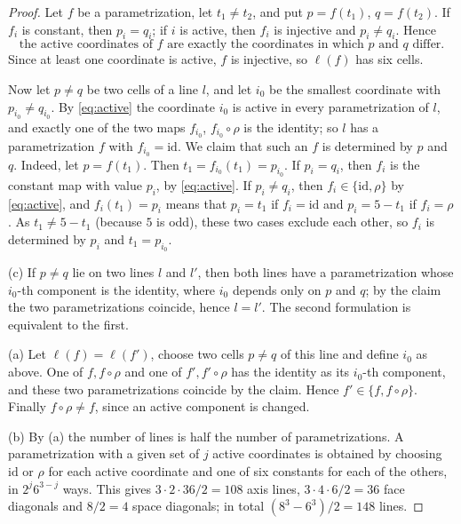 \begin{proof}
Let $f$ be a parametrization, let $t_1\ne t_2$, and put $p=f(t_1)$, $q=f(t_2)$. If $f_i$ is constant, then
$p_i=q_i$; if $i$ is active, then $f_i$ is injective and $p_i\ne q_i$. Hence
\begin{equation}\label{eq:active}
  \text{the active coordinates of $f$ are exactly the coordinates in which $p$ and $q$ differ.}
\end{equation}
Since at least one coordinate is active, $f$ is injective, so $\ell(f)$ has six cells.

Now let $p\ne q$ be two cells of a line $l$, and let $i_0$ be the smallest coordinate with
$p_{i_0}\ne q_{i_0}$. By \eqref{eq:active} the coordinate $i_0$ is active in every parametrization of $l$,
and exactly one of the two maps $f_{i_0}$, $f_{i_0}\circ\rho$ is the identity; so $l$ has a
parametrization $f$ with $f_{i_0}=\mathrm{id}$. We claim that such an $f$ is determined by $p$ and $q$.
Indeed, let $p=f(t_1)$. Then $t_1=f_{i_0}(t_1)=p_{i_0}$. If $p_i=q_i$, then $f_i$ is the constant map with
value $p_i$, by \eqref{eq:active}. If $p_i\ne q_i$, then $f_i\in\{\mathrm{id},\rho\}$ by \eqref{eq:active},
and $f_i(t_1)=p_i$ means that $p_i=t_1$ if $f_i=\mathrm{id}$ and $p_i=5-t_1$ if $f_i=\rho$. As
$t_1\ne 5-t_1$ (because $5$ is odd), these two cases exclude each other, so $f_i$ is determined by $p_i$
and $t_1=p_{i_0}$.

(c) If $p\ne q$ lie on two lines $l$ and $l'$, then both lines have a parametrization whose
$i_0$-th component is the identity, where $i_0$ depends only on $p$ and $q$; by the claim the two
parametrizations coincide, hence $l=l'$. The second formulation is equivalent to the first.

(a) Let $\ell(f)=\ell(f')$, choose two cells $p\ne q$ of this line and define $i_0$ as above. One of
$f,f\circ\rho$ and one of $f',f'\circ\rho$ has the identity as its $i_0$-th component, and these two
parametrizations coincide by the claim. Hence $f'\in\{f,f\circ\rho\}$. Finally $f\circ\rho\ne f$, since an
active component is changed.

(b) By (a) the number of lines is half the number of parametrizations. A parametrization with a given set
of $j$ active coordinates is obtained by choosing $\mathrm{id}$ or $\rho$ for each active coordinate and one
of six constants for each of the others, in $2^j6^{3-j}$ ways. This gives $3\cdot 2\cdot 36/2=108$ axis
lines, $3\cdot 4\cdot 6/2=36$ face diagonals and $8/2=4$ space diagonals; in total
$(8^3-6^3)/2=148$ lines.
\end{proof}

